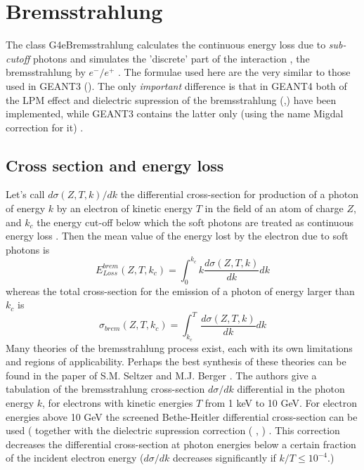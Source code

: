 \chapter[Bremsstrahlung]{Bremsstrahlung}
 

 The class G4eBremsstrahlung calculates the continuous energy loss
  due to {\em sub-cutoff} photons and
 simulates the 'discrete' part of the interaction ,
the bremsstrahlung  by $e^-/e^+$ . The formulae used here
 are the very similar to those used in GEANT3 (\cite{ebrem.geant3}).
 The only {\em important} difference is that in GEANT4 both of the LPM 
effect and dielectric supression of the bremsstrahlung 
(\cite{ebrem.galitsky},\cite{ebrem.anthony}) have been implemented,
while GEANT3 contains the latter only (using the name Migdal correction
for it) .

\section{Cross section and energy loss}

Let's call $d\sigma(Z,T,k)/dk$ the differential cross-section for
production of a photon of energy $k$ by an electron of kinetic energy
$T$ in the field of an atom of charge $Z$, and
$k_c$ the energy cut-off below which the soft photons are treated
as continuous energy loss .
Then the mean value of the energy lost by the electron due
to soft photons is
\begin{equation}
  E_{Loss}^{brem} (Z,T,k_c ) =
\int_{0}^{k_ c}k\frac{d \sigma (Z,T,k)}{dk}dk
\end{equation}
whereas the total cross-section for the emission of
a photon of energy larger than $k_c$ is
\begin{equation}
 \sigma_{brem} (Z,T,k_c ) = \int_{k_c}^{T}\frac{d \sigma (Z,T,k)}{dk} dk
\end{equation}
Many theories of the bremsstrahlung process exist, each with its own
limitations and regions of applicability. Perhaps the best synthesis
of these theories can be found in the paper of S.M. Seltzer and M.J.
Berger \cite{ebrem.seltzer}. The authors give a tabulation of the
bremsstrahlung cross-section $d\sigma/dk$ differential in the photon
energy $k$, for electrons with kinetic energies $T$ from 1 keV to 10
GeV. For electron energies above 10 GeV the screened Bethe-Heitler
differential cross-section can be used
(\cite{ebrem.egs4}  
together with the dielectric supression
correction (\cite{ebrem.messel} , \cite{ebrem.migdal} ) .
  This correction      
 decreases the differential cross-section at photon
energies below a certain fraction of the incident electron energy
($d\sigma/dk$ decreases significantly if $ k/T \leq 10^{-4}$.)

